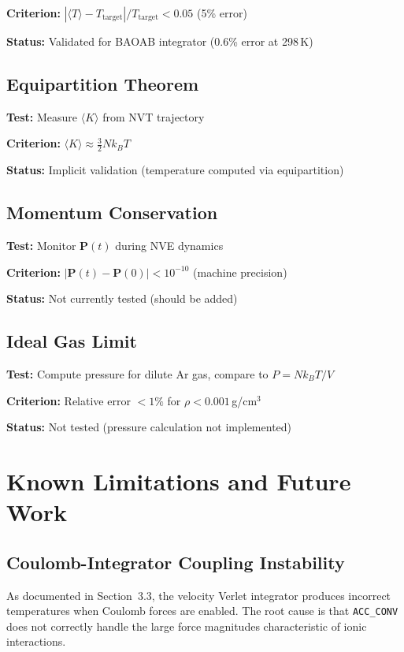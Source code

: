 \documentclass[11pt]{article}
\begin{document}
\textbf{Criterion:} $|\langle T \rangle - T_{\text{target}}| / T_{\text{target}} < 0.05$ (5\% error)

\textbf{Status:} Validated for BAOAB integrator (0.6\% error at 298\,K)

\subsection{Equipartition Theorem}

\textbf{Test:} Measure $\langle K \rangle$ from NVT trajectory

\textbf{Criterion:} $\langle K \rangle \approx \frac{3}{2} N k_B T$

\textbf{Status:} Implicit validation (temperature computed via equipartition)

\subsection{Momentum Conservation}

\textbf{Test:} Monitor $\mathbf{P}(t)$ during NVE dynamics

\textbf{Criterion:} $|\mathbf{P}(t) - \mathbf{P}(0)| < 10^{-10}$ (machine precision)

\textbf{Status:} Not currently tested (should be added)

\subsection{Ideal Gas Limit}

\textbf{Test:} Compute pressure for dilute Ar gas, compare to $P = Nk_BT/V$

\textbf{Criterion:} Relative error $< 1\%$ for $\rho < 0.001$\,g/cm$^3$

\textbf{Status:} Not tested (pressure calculation not implemented)

\section{Known Limitations and Future Work}

\subsection{Coulomb-Integrator Coupling Instability}

As documented in Section~3.3, the velocity Verlet integrator produces incorrect temperatures when Coulomb forces are enabled. The root cause is that \texttt{ACC\_CONV} does not correctly handle the large force magnitudes characteristic of ionic interactions.
\end{document}
